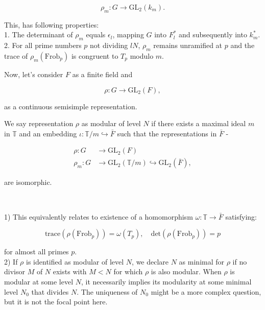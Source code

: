 \begin{proposition}
\begin{proposition}
\[
\rho_{m}: G \rightarrow \text{GL}_2(k_{m}).
\]

This, has following properties: \\
1. The determinant of \( \rho_{m} \) equals \( \epsilon_{l} \), mapping \( G \) into \( F_{l}^{*} \) and subsequently into \( k_{m}^{*} \).\\
2. For all prime numbers \( p \) not dividing \( lN \), \( \rho_{m} \) remains unramified at \( p \) and the trace of \( \rho_{m}(\text{Frob}_p) \) is congruent to \( T_{p} \) modulo \( m \).

Now, let's consider \( F \) as a finite field and

\[
\rho: G \rightarrow \text{GL}_2(F),
\]

as a continuous semisimple representation. \\

\begin{definition}
    We say representation \( \rho \) as modular of level \( N \) if there exists a maximal ideal \( m \) in \( \mathbb{T} \) and an embedding \( \iota: \mathbb{T} / m \hookrightarrow \bar{F} \) such that the representations in \( \bar{F} \) -

\[
\begin{aligned}
\rho: G &\rightarrow \text{GL}_2(F)  \\
\rho_{m}: G &\rightarrow \text{GL}_2(\mathbb{T} / m) \hookrightarrow \text{GL}_2(\bar{F}),
\end{aligned}
\]

are isomorphic.
\end{definition}\\

\begin{remark}
1) This equivalently relates to existence of a homomorphism \( \omega: \mathbb{T} \rightarrow \bar{F} \) satisfying:

\[
\text{trace}(\rho(\text{Frob}_p)) = \omega(T_{p}), \quad \text{det}(\rho(\text{Frob}_p)) = p
\]

for almost all primes \( p \). \\
2)
If \( \rho \) is identified as modular of level \( N \), we declare \( N \) as minimal for \( \rho \) if no divisor \( M \) of \( N \) exists with \( M < N \) for which \( \rho \) is also modular. When \( \rho \) is modular at some level \( N \), it necessarily implies its modularity at some minimal level \( N_{0} \) that divides \( N \). The uniqueness of \( N_{0} \) might be a more complex question, but it is not the focal point here. 


\end{remark}
\end{proposition}
\end{proposition}
